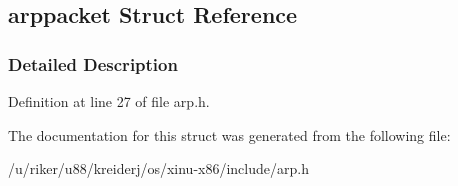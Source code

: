 \hypertarget{structarppacket}{}\subsection{arppacket Struct Reference}
\label{structarppacket}


\subsubsection{Detailed Description}


Definition at line 27 of file arp.\+h.



The documentation for this struct was generated from the following file\+:\begin{DoxyCompactItemize}
\item 
/u/riker/u88/kreiderj/os/xinu-\/x86/include/arp.\+h\end{DoxyCompactItemize}
